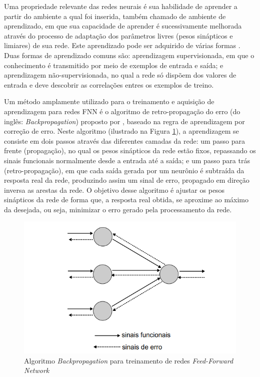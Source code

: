 Uma propriedade relevante das redes neurais é sua habilidade de aprender a partir do ambiente a qual foi inserida, também chamado de ambiente de aprendizado, em que sua capacidade de aprender é sucessivamente melhorada através do processo de adaptação dos parâmetros livres (pesos sinápticos e limiares) de sua rede. Este aprendizado pode ser adquirido de várias formas \citep{bishop2006pattern, duda1973pattern, Rauber2005}. Duas formas de aprendizado comuns são: aprendizagem supervisionada, em que o conhecimento é transmitido por meio de exemplos de entrada e saída; e aprendizagem não-supervisionada, no qual a rede só dispõem dos valores de entrada e deve descobrir as correlações entres os exemplos de treino.

Um método amplamente utilizado para o treinamento e aquisição de aprendizagem para redes FNN é o algoritmo de retro-propagação do erro (do inglês: \textit{Backpropagation}) proposto por \cite{werbos1974beyond}, baseado na regra de aprendizagem por correção de erro. Neste algoritmo (ilustrado na Figura \ref{fig:backpropagationExample}), a aprendizagem se consiste em dois passos através das diferentes camadas da rede: um passo para frente (propagação), no qual os pesos sinápticos da rede estão fixos, repassando os sinais funcionais normalmente desde a entrada até a saída; e um passo para trás (retro-propagação), em que cada saída gerada por um neurônio é subtraída da resposta real da rede, produzindo assim um sinal de erro, propagado em direção inversa as arestas da rede. O objetivo desse algoritmo é ajustar os pesos sinápticos da rede de forma que, a resposta real obtida, se aproxime ao máximo da desejada, ou seja, minimizar o erro gerado pela processamento da rede.

\begin{figure}[ht!]
\caption{Algoritmo \textit{Backpropagation} para treinamento de redes \textit{Feed-Forward Network}}
\label{fig:backpropagationExample}
\centering
\includegraphics[scale=0.75]{img/backpropagationExample.png}
\end{figure}

